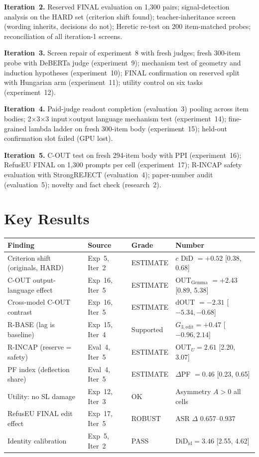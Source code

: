 \documentclass[11pt,letterpaper]{article}
\begin{document}
\textbf{Iteration~2.} Reserved FINAL evaluation on 1,300 pairs; signal-detection analysis on the HARD set (criterion shift found); teacher-inheritance screen (wording inherits, decisions do not); Heretic re-test on 200 item-matched probes; reconciliation of all iteration-1 screens.

\textbf{Iteration~3.} Screen repair of experiment~8 with fresh judges; fresh 300-item probe with DeBERTa judge (experiment~9); mechanism test of geometry and induction hypotheses (experiment~10); FINAL confirmation on reserved split with Hungarian arm (experiment~11); utility control on six tasks (experiment~12).

\textbf{Iteration~4.} Paid-judge readout completion (evaluation~3) pooling across item bodies; 2$\times$3$\times$3 input$\times$output language mechanism test (experiment~14); fine-grained lambda ladder on fresh 300-item body (experiment~15); held-out confirmation slot failed (GPU lost).

\textbf{Iteration~5.} C-OUT test on fresh 294-item body with PPI (experiment~16); RefusEU FINAL on 1,300 prompts per cell (experiment~17); R-INCAP safety evaluation with StrongREJECT (evaluation~4); paper-number audit (evaluation~5); novelty and fact check (research~2).

\section{Key Results}

\begin{table}[!htbp]
\centering
{\small
\begin{tabularx}{\linewidth}{>{\raggedright\arraybackslash}p{3.2cm}p{2.5cm}lX}
\toprule
Finding & Source & Grade & Number \\
\midrule
Criterion shift (originals, HARD) & Exp~5, Iter~2 & ESTIMATE & $c$ DiD $= +0.52$ [0.38, 0.68] \\
C-OUT output-language effect & Exp~16, Iter~5 & ESTIMATE & OUT$_{\text{Gemma}}$ $= +2.43$ [0.89, 5.38] \\
Cross-model C-OUT contrast & Exp~16, Iter~5 & ESTIMATE & dOUT $= -2.31$ [$-5.34, -0.68$] \\
R-BASE (lag is baseline) & Exp~15, Iter~4 & Supported & $G_{3,\text{edit}} = +0.47$ [$-0.96, 2.14$] \\
R-INCAP (reserve = safety) & Eval~4, Iter~5 & ESTIMATE & OUT$_U = 2.61$ [2.20, 3.07] \\
PF index (deflection share) & Eval~4, Iter~5 & ESTIMATE & $\Delta$PF $= 0.46$ [0.23, 0.65] \\
Utility: no SL damage & Exp~12, Iter~3 & OK & Asymmetry $A > 0$ all cells \\
RefusEU FINAL edit effect & Exp~17, Iter~5 & ROBUST & ASR $\Delta$ 0.657--0.937 \\
Identity calibration & Exp~5, Iter~2 & PASS & DiD$_{\text{id}} = 3.46$ [2.55, 4.62] \\
\bottomrule
\end{tabularx}
}
\end{table}
\end{document}
